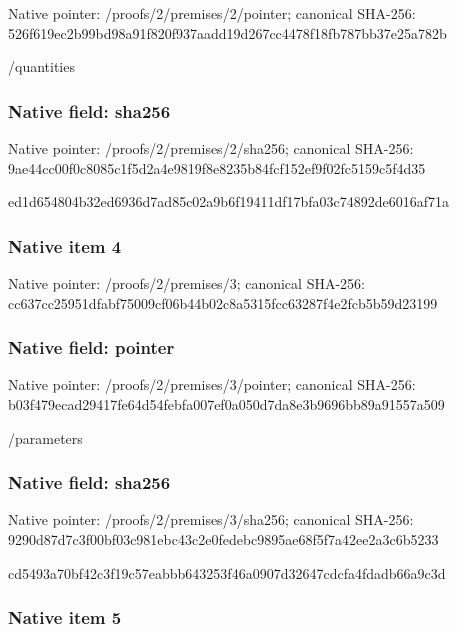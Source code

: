 \documentclass[10pt,a4paper]{article}
\begin{document}
Native pointer: /proofs/2/premises/2/pointer; canonical SHA-256: 526f619ec2b99bd98a91f820\allowbreak{}f937aadd19d267cc4478f18f\allowbreak{}b787bb37e25a782b


/quantities


\subsubsection{Native field: sha256}


Native pointer: /proofs/2/premises/2/sha256; canonical SHA-256: 9ae44cc00f0c8085c1f5d2a4\allowbreak{}e9819f8e8235b84fcf152ef9\allowbreak{}f02fc5159c5f4d35


ed1d654804b32ed6936d7ad8\allowbreak{}5c02a9b6f19411df17bfa03c\allowbreak{}74892de6016af71a


\subsubsection{Native item 4}


Native pointer: /proofs/2/premises/3; canonical SHA-256: cc637cc25951dfabf75009cf\allowbreak{}06b44b02c8a5315fcc63287f\allowbreak{}4e2fcb5b59d23199



\subsubsection{Native field: pointer}


Native pointer: /proofs/2/premises/3/pointer; canonical SHA-256: b03f479ecad29417fe64d54f\allowbreak{}ebfa007ef0a050d7da8e3b96\allowbreak{}96bb89a91557a509


/parameters


\subsubsection{Native field: sha256}


Native pointer: /proofs/2/premises/3/sha256; canonical SHA-256: 9290d87d7c3f00bf03c981eb\allowbreak{}c43c2e0fedebc9895ae68f5f\allowbreak{}7a42ee2a3c6b5233


cd5493a70bf42c3f19c57eab\allowbreak{}bb643253f46a0907d32647cd\allowbreak{}cfa4fdadb66a9c3d


\subsubsection{Native item 5}
\end{document}
